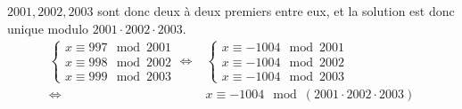 {\begin{enumerate}
{      $2001,2002,2003$ sont donc deux à deux premiers entre eux, et la
      solution est donc unique modulo $2001\cdot2002\cdot2003$.
    \begin{align*}
      \begin{cases}        
        x \equiv 997 \mod 2001\\
        x \equiv 998 \mod 2002\\
        x \equiv 999 \mod 2003
      \end{cases}
      \Leftrightarrow&
      \begin{cases}        
        x \equiv -1004 \mod 2001\\
        x \equiv -1004 \mod 2002\\
        x \equiv -1004 \mod 2003
      \end{cases}\\
      \Leftrightarrow&
        x \equiv -1004 \mod (2001\cdot2002\cdot2003)
    \end{align*}}
\end{enumerate}
}